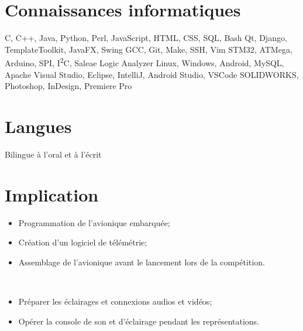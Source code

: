 \documentclass[11pt,letterpaper,sans]{moderncv}        %
\begin{document}
\section{Connaissances informatiques}
 {C, C++, Java, Python, Perl, JavaScript, HTML, CSS, SQL, Bash}
 {Qt, Django, TemplateToolkit, JavaFX, Swing}
 {GCC, Git, Make, SSH, Vim}
 {STM32, ATMega, Arduino, SPI, I\textsuperscript{2}C, Saleae Logic Analyzer}
 {Linux, Windows, Android, MySQL, Apache}
 {Visual Studio, Eclipse, IntelliJ, Android Studio, VSCode}
 {SOLIDWORKS, Photoshop, InDesign, Premiere Pro}


\section{Langues}
             {}
 {Bilingue à l'oral et à l'écrit}{}


\section{Implication}
{%
\begin{itemize}%
 \item Programmation de l'avionique embarquée;%
 \item Création d'un logiciel de télémétrie;%
 \item Assemblage de l'avionique avant le lancement lors de la compétition.%
\end{itemize}}
\ \\
{%
\begin{itemize}%
 \item Préparer les éclairages et connexions audios et vidéos;%
 \item Opérer la console de son et d'éclairage pendant les représentations.%
\end{itemize}}
\end{document}
